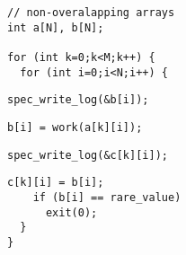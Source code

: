 \begin{lstlisting}[morekeywords={g_qCount},belowskip=0pt, firstnumber=1, name=ver1]
// non-overalapping arrays
int a[N], b[N];

for (int k=0;k<M;k++) {
  for (int i=0;i<N;i++) {
\end{lstlisting}

\begin{lstlisting}[aboveskip=0pt,belowskip=0pt,backgroundcolor=\color{lightgray}, firstnumber=auto, name=ver1]
    spec_write_log(&b[i]);
\end{lstlisting}

\begin{lstlisting}[aboveskip=0pt,belowskip=0pt, firstnumber=auto, name=ver2a]
    b[i] = work(a[k][i]);
\end{lstlisting}

\begin{lstlisting}[aboveskip=0pt,belowskip=0pt,backgroundcolor=\color{lightgray},
firstnumber=auto, name=ver2a]
    spec_write_log(&c[k][i]);
\end{lstlisting}

\begin{lstlisting}[aboveskip=0pt,belowskip=0pt, firstnumber=auto, name=ver1]
    c[k][i] = b[i];
    if (b[i] == rare_value)
      exit(0);
  }
}
\end{lstlisting}
